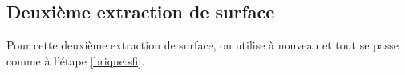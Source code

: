 	\subsection{Deuxième extraction de surface}

Pour cette deuxième extraction de surface, on utilise à nouveau  et tout se passe comme à l'étape \ref{brique:sfi}.